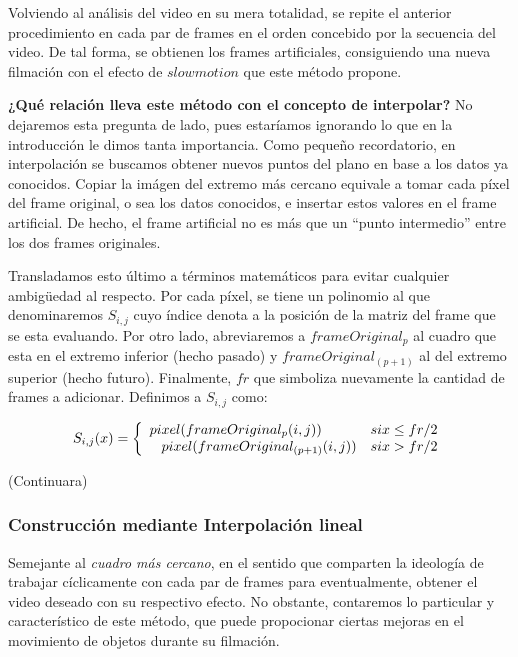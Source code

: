 Volviendo al an\'alisis del video en su mera totalidad, se repite el anterior procedimiento en cada par de frames en el orden concebido por la secuencia del video. De tal forma, se obtienen los frames artificiales, consiguiendo una nueva filmaci\'on con el efecto de $slowmotion$ que este m\'etodo propone. 

\textbf{¿Qu\'e relaci\'on lleva este m\'etodo con el concepto de interpolar?} No dejaremos esta pregunta de lado, pues estar\'iamos ignorando lo que en la introducci\'on le dimos tanta importancia. Como pequeño recordatorio, en interpolaci\'on se buscamos obtener nuevos puntos del plano en base a los datos ya conocidos. Copiar la im\'agen del extremo m\'as cercano equivale a tomar cada p\'ixel del frame original, o sea los datos conocidos, e insertar estos valores en el frame artificial. De hecho, el frame artificial no es m\'as que un ``punto intermedio'' entre los dos frames originales.

Transladamos esto \'ultimo a t\'erminos matem\'aticos para evitar cualquier ambigüedad al respecto. Por cada p\'ixel, se tiene un polinomio al que denominaremos $S_{i,j}$ cuyo \'indice denota a la posici\'on de la matriz del frame que se esta evaluando. Por otro lado, abreviaremos a $frameOriginal_{p}$ al cuadro que esta en el extremo inferior (hecho pasado) y $frameOriginal_{(p+1)}$ al del extremo superior (hecho futuro). Finalmente, $fr$ que simboliza nuevamente la cantidad de frames a adicionar. Definimos a $S_{i,j}$ como:

\[
S_{i,j}(x) = 
\left\{
    \begin{array}{ll}
        pixel(frameOriginal_{p}(i,j)) & \mbox{si } x \leq fr/2 \\
        \hspace{0.3cm}     
        pixel(frameOriginal_{(p+1)}(i,j)) & \mbox{si } x > fr/2
    \end{array}
\right.
\]

(Continuara)

\subsubsection{Construcci\'on mediante Interpolaci\'on lineal}

Semejante al \emph{cuadro m\'as cercano}, en el sentido que comparten la ideolog\'ia de trabajar c\'iclicamente con cada par de frames para eventualmente, obtener el video deseado con su respectivo efecto. No obstante, contaremos lo particular y caracter\'istico de este m\'etodo, que puede propocionar ciertas mejoras en el movimiento de objetos durante su filmaci\'on.


